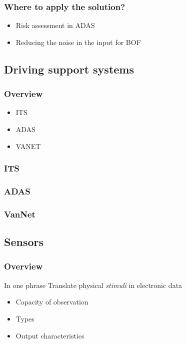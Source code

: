 \documentclass{beamer}
\begin{document}
	\begin{frame}
		\frametitle{Where to apply the solution?}
			
		\begin{itemize}
		\item Risk assessment in ADAS
		\item Reducing the noise in the input for BOF
		\end{itemize}
	
	\end{frame}
	
\subsection{Driving support systems}

	\begin{frame}
		\frametitle{Overview}
	
		\begin{itemize}
			\item ITS
			\item ADAS
			\item VANET
		\end{itemize}
		
	\end{frame}

	\begin{frame}
		\frametitle{ITS}
	\end{frame}

	\begin{frame}
		\frametitle{ADAS}
	\end{frame}

	\begin{frame}
		\frametitle{VanNet}
	\end{frame}

\subsection{Sensors}

	\begin{frame}
		\frametitle{Overview}
	
		\begin{block}{In one phrase}
			Translate physical \textit{stimuli} in electronic data
		\end{block}
	
		\begin{itemize}
			\item Capacity of observation
			\item Types
			\item Output characteristics
		\end{itemize}
		
	\end{frame}
\end{document}
